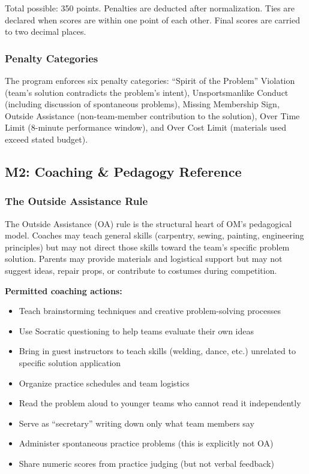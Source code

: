 \documentclass[11pt,letterpaper]{article}
\begin{document}
Total possible: 350 points. Penalties are deducted after normalization. Ties are declared when scores are within one point of each other. Final scores are carried to two decimal places.

\subsubsection{Penalty Categories}

The program enforces six penalty categories: ``Spirit of the Problem'' Violation (team's solution contradicts the problem's intent), Unsportsmanlike Conduct (including discussion of spontaneous problems), Missing Membership Sign, Outside Assistance (non-team-member contribution to the solution), Over Time Limit (8-minute performance window), and Over Cost Limit (materials used exceed stated budget).

\subsection{M2: Coaching \& Pedagogy Reference}

\subsubsection{The Outside Assistance Rule}

The Outside Assistance (OA) rule is the structural heart of OM's pedagogical model. Coaches may teach general skills (carpentry, sewing, painting, engineering principles) but may not direct those skills toward the team's specific problem solution. Parents may provide materials and logistical support but may not suggest ideas, repair props, or contribute to costumes during competition.

\textbf{Permitted coaching actions:}
\begin{itemize}[leftmargin=2em]
\item Teach brainstorming techniques and creative problem-solving processes
\item Use Socratic questioning to help teams evaluate their own ideas
\item Bring in guest instructors to teach skills (welding, dance, etc.) unrelated to specific solution application
\item Organize practice schedules and team logistics
\item Read the problem aloud to younger teams who cannot read it independently
\item Serve as ``secretary'' writing down only what team members say
\item Administer spontaneous practice problems (this is explicitly not OA)
\item Share numeric scores from practice judging (but not verbal feedback)
\end{itemize}
\end{document}
